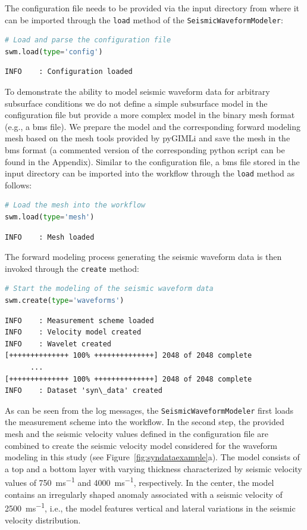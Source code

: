 \documentclass[a4paper,fleqn]{cas-sc}
\begin{document}
The configuration file needs to be provided via the input directory from where it can be imported through the \texttt{load} method of the \texttt{SeismicWaveformModeler}:
\begin{lstlisting}[language=Python, firstnumber=6]
# Load and parse the configuration file
swm.load(type='config')
\end{lstlisting}
\begin{footnotesize}
\begin{verbatim}
INFO    : Configuration loaded
\end{verbatim}
\end{footnotesize}
To demonstrate the ability to model seismic waveform data for arbitrary subsurface conditions we do not define a simple subsurface model in the configuration file but provide a more complex model in the binary mesh format (e.g., a bms file). We prepare the model and the corresponding forward modeling mesh based on the mesh tools provided by pyGIMLi and save the mesh in the bms format (a commented version of the corresponding python script can be found in the Appendix). Similar to the configuration file, a bms file stored in the input directory can be imported into the workflow through the \texttt{load} method as follows:
\begin{lstlisting}[language=Python, firstnumber=8]
# Load the mesh into the workflow
swm.load(type='mesh')
\end{lstlisting}
\begin{footnotesize}
\begin{verbatim}
INFO    : Mesh loaded
\end{verbatim}
\end{footnotesize}
The forward modeling process generating the seismic waveform data is then invoked through the \texttt{create} method:
\begin{lstlisting}[language=Python, firstnumber=10]
# Start the modeling of the seismic waveform data
swm.create(type='waveforms')
\end{lstlisting}
\begin{footnotesize}
\begin{verbatim}
INFO    : Measurement scheme loaded
INFO    : Velocity model created
INFO    : Wavelet created
[++++++++++++++ 100% ++++++++++++++] 2048 of 2048 complete
      ...
[++++++++++++++ 100% ++++++++++++++] 2048 of 2048 complete
INFO    : Dataset 'syn\_data' created
\end{verbatim}
\end{footnotesize}
As can be seen from the log messages, the \texttt{SeismicWaveformModeler} first loads the measurement scheme into the workflow. In the second step, the provided mesh and the seismic velocity values defined in the configuration file are combined to create the seismic velocity model considered for the waveform modeling in this study (see Figure~\ref{fig:syndataexample}a). The model consists of a top and a bottom layer with varying thickness characterized by seismic velocity values of \qty{750}{ms^{-1}} and \qty{4000}{ms^{-1}}, respectively. In the center, the model contains an irregularly shaped anomaly associated with a seismic velocity of \qty{2500}{ms^{-1}}, i.e., the model features vertical and lateral variations in the seismic velocity distribution.
\end{document}
